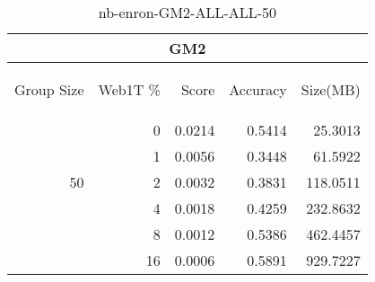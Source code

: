 \begin{center}
\begin{table}[htbp]
\begin{tabular}{ | r | r | r | r | r |}
\hline
\multicolumn{5}{|c|}{GM2}\\
\hline
\begin{sideways}Group Size\end{sideways} & \begin{sideways}Web1T \%\end{sideways} & \begin{sideways}Score\end{sideways} & \begin{sideways}Accuracy\end{sideways} & \begin{sideways}Size(MB)\end{sideways}\\
\hline
\multirow{5}{*}{50}
 & 0 & 0.0214 & 0.5414 & 25.3013\\ \cline{2-5}
 & 1 & 0.0056 & 0.3448 & 61.5922\\ \cline{2-5}
 & 2 & 0.0032 & 0.3831 & 118.0511\\ \cline{2-5}
 & 4 & 0.0018 & 0.4259 & 232.8632\\ \cline{2-5}
 & 8 & 0.0012 & 0.5386 & 462.4457\\ \cline{2-5}
 & 16 & 0.0006 & 0.5891 & 929.7227\\ \cline{2-5}
\hline
\end{tabular}
\caption{nb-enron-GM2-ALL-ALL-50}
\label{table:nb-enron-GM2-ALL-ALL-50}
\end{table}
\end{center}

